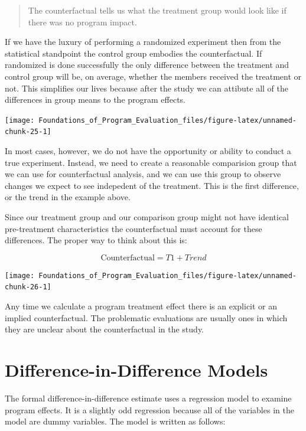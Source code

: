\documentclass[]{book}
\theoremstyle{definition}
\theoremstyle{definition}
\theoremstyle{definition}
\theoremstyle{remark}
\begin{document}
\begin{quote}
The counterfactual tells us what the treatment group would look like if
there was no program impact.
\end{quote}

If we have the luxury of performing a randomized experiment then from
the statistical standpoint the control group embodies the
counterfactual. If randomized is done successfully the only difference
between the treatment and control group will be, on average, whether the
members received the treatment or not. This simplifies our lives because
after the study we can attibute all of the differences in group means to
the program effects.

\begin{center}\texttt{[image: Foundations\_of\_Program\_Evaluation\_files/figure-latex/unnamed-chunk-25-1]} \end{center}

In most cases, however, we do not have the opportunity or ability to
conduct a true experiment. Instead, we need to create a reasonable
comparision group that we can use for counterfactual analysis, and we
can use this group to observe changes we expect to see indepedent of the
treatment. This is the first difference, or the trend in the example
above.

Since our treatment group and our comparison group might not have
identical pre-treatment characteristics the counterfactual must account
for these differences. The proper way to think about this is:

\[ \textrm{Counterfactual} = T1 + Trend \]

\begin{center}\texttt{[image: Foundations\_of\_Program\_Evaluation\_files/figure-latex/unnamed-chunk-26-1]} \end{center}

Any time we calculate a program treatment effect there is an explicit or
an implied counterfactual. The problematic evaluations are usually ones
in which they are unclear about the counterfactual in the study.

\hypertarget{difference-in-difference-models-1}{%
\section{Difference-in-Difference
Models}\label{difference-in-difference-models-1}}

The formal difference-in-difference estimate uses a regression model to
examine program effects. It is a slightly odd regression because all of
the variables in the model are dummy variables. The model is written as
follows:
\end{document}
